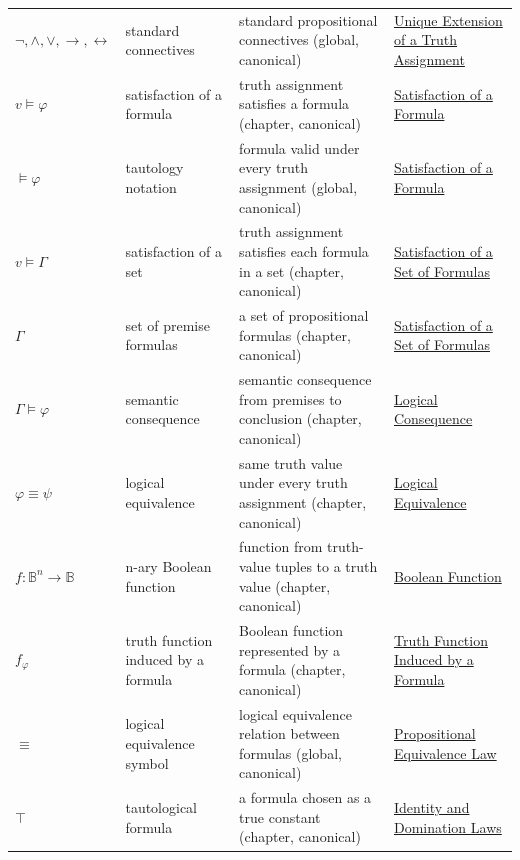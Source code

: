 \begin{longtable}{p{}p{}p{}p{}}
\(\neg,\land,\lor,\to,\leftrightarrow\) & standard connectives & standard propositional connectives (global, canonical) & \hyperref[thm:unique-extension-truth-assignment-propositional-logic]{Unique Extension of a Truth Assignment}\\
\(v\models\varphi\) & satisfaction of a formula & truth assignment satisfies a formula (chapter, canonical) & \hyperref[def:satisfaction-propositional-formula]{Satisfaction of a Formula}\\
\(\models\varphi\) & tautology notation & formula valid under every truth assignment (global, canonical) & \hyperref[def:satisfaction-propositional-formula]{Satisfaction of a Formula}\\
\(v\models\Gamma\) & satisfaction of a set & truth assignment satisfies each formula in a set (chapter, canonical) & \hyperref[def:satisfaction-set-propositional-logic]{Satisfaction of a Set of Formulas}\\
\(\Gamma\) & set of premise formulas & a set of propositional formulas (chapter, canonical) & \hyperref[def:satisfaction-set-propositional-logic]{Satisfaction of a Set of Formulas}\\
\(\Gamma\models\varphi\) & semantic consequence & semantic consequence from premises to conclusion (chapter, canonical) & \hyperref[def:logical-consequence-propositional-logic]{Logical Consequence}\\
\(\varphi\equiv\psi\) & logical equivalence & same truth value under every truth assignment (chapter, canonical) & \hyperref[def:logical-equivalence-propositional-logic]{Logical Equivalence}\\
\(f:\mathbb{B}^n\to\mathbb{B}\) & n-ary Boolean function & function from truth-value tuples to a truth value (chapter, canonical) & \hyperref[def:boolean-function-propositional-logic]{Boolean Function}\\
\(f_\varphi\) & truth function induced by a formula & Boolean function represented by a formula (chapter, canonical) & \hyperref[def:truth-function-induced-by-formula]{Truth Function Induced by a Formula}\\
\(\equiv\) & logical equivalence symbol & logical equivalence relation between formulas (global, canonical) & \hyperref[def:propositional-equivalence-law]{Propositional Equivalence Law}\\
\(\top\) & tautological formula & a formula chosen as a true constant (chapter, canonical) & \hyperref[thm:identity-domination-laws-propositional-logic]{Identity and Domination Laws}\\

\end{longtable}
